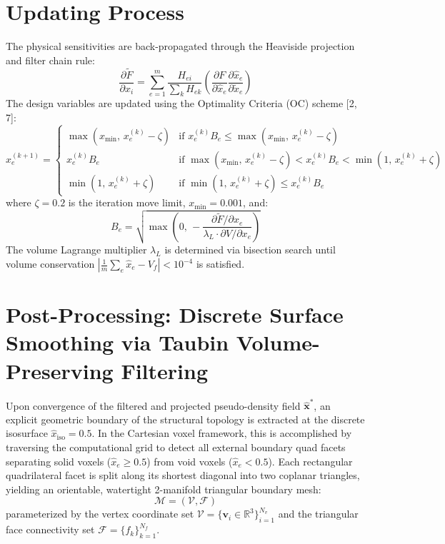 \documentclass[11pt, a4paper]{article}
\begin{document}
\section{Updating Process}
The physical sensitivities are back-propagated through the Heaviside projection and filter chain rule:
\begin{equation}
\frac{\partial \tilde{F}}{\partial x_i} = \sum_{e=1}^m \frac{H_{ei}}{\sum_k H_{ek}} \left( \frac{\partial F}{\partial \hat{x}_e} \frac{\partial \hat{x}_e}{\partial \tilde{x}_e} \right)
\end{equation}
The design variables are updated using the Optimality Criteria (OC) scheme [2, 7]:
\begin{equation}
x_e^{(k+1)} = \begin{cases}
\max(x_{\min}, \, x_e^{(k)} - \zeta) & \text{if } x_e^{(k)} B_e \le \max(x_{\min}, \, x_e^{(k)} - \zeta) \\[4pt]
x_e^{(k)} B_e & \text{if } \max(x_{\min}, \, x_e^{(k)} - \zeta) < x_e^{(k)} B_e < \min(1, \, x_e^{(k)} + \zeta) \\[4pt]
\min(1, \, x_e^{(k)} + \zeta) & \text{if } \min(1, \, x_e^{(k)} + \zeta) \le x_e^{(k)} B_e
\end{cases}
\end{equation}
where $\zeta = 0.2$ is the iteration move limit, $x_{\min} = 0.001$, and:
\begin{equation}
B_e = \sqrt{\max\left(0, \, -\frac{\partial \tilde{F} / \partial x_e}{\lambda_L \cdot \partial V / \partial x_e}\right)}
\end{equation}
The volume Lagrange multiplier $\lambda_L$ is determined via bisection search until volume conservation $|\frac{1}{m}\sum_e \hat{x}_e - V_f| < 10^{-4}$ is satisfied.

\section{Post-Processing: Discrete Surface Smoothing via Taubin Volume-Preserving Filtering}
Upon convergence of the filtered and projected pseudo-density field $\hat{\mathbf{x}}^*$, an explicit geometric boundary of the structural topology is extracted at the discrete isosurface $\hat{x}_{\text{iso}} = 0.5$. In the Cartesian voxel framework, this is accomplished by traversing the computational grid to detect all external boundary quad facets separating solid voxels ($\hat{x}_e \ge 0.5$) from void voxels ($\hat{x}_e < 0.5$). Each rectangular quadrilateral facet is split along its shortest diagonal into two coplanar triangles, yielding an orientable, watertight 2-manifold triangular boundary mesh:
\begin{equation}
\mathcal{M} = (\mathcal{V}, \mathcal{F})
\end{equation}
parameterized by the vertex coordinate set $\mathcal{V} = \{\mathbf{v}_i \in \mathbb{R}^3\}_{i=1}^{N_v}$ and the triangular face connectivity set $\mathcal{F} = \{f_k\}_{k=1}^{N_f}$.
\end{document}
